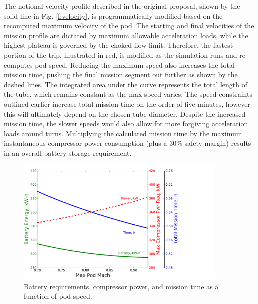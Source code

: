 \documentclass[heading.tex]{subfiles}
\begin{document}
The notional velocity profile described in the original proposal, shown by the solid line in Fig. \ref{f:velocity},
is programmatically modified based on the recomputed maximum velocity of the pod. The starting and final velocities of the
mission profile are dictated by maximum allowable acceleration loads, while the highest plateau is governed by the
choked flow limit. Therefore, the fastest portion of the trip, illustrated in red, is modified as the simulation runs and re-computes pod speed.
Reducing the maximum speed also increases the total mission time,
pushing the final mission segment out further as shown by the dashed lines.
The integrated area under the curve represents the total length of the tube, which remains constant as the max speed varies.
The speed constraints outlined earlier increase total mission time on the order of five minutes,
however this will ultimately depend on the chosen tube diameter.
Despite the increased mission time, the slower speeds would also allow for more forgiving acceleration loads around turns.
Multiplying the calculated mission time by the maximum instantaneous compressor power consumption (plus a 30\% safety margin)
results in an overall battery storage requirement.

\begin{figure}[hbtp]
\centering
\includegraphics[width=0.9\textwidth]{images/battery_plot.pdf}
\caption[Battery/Compressor/Mission requirements as a function of pod speed]
{Battery requirements, compressor power, and mission time as a function of pod speed.}
\label{f:battery}
\end{figure}
\end{document}
